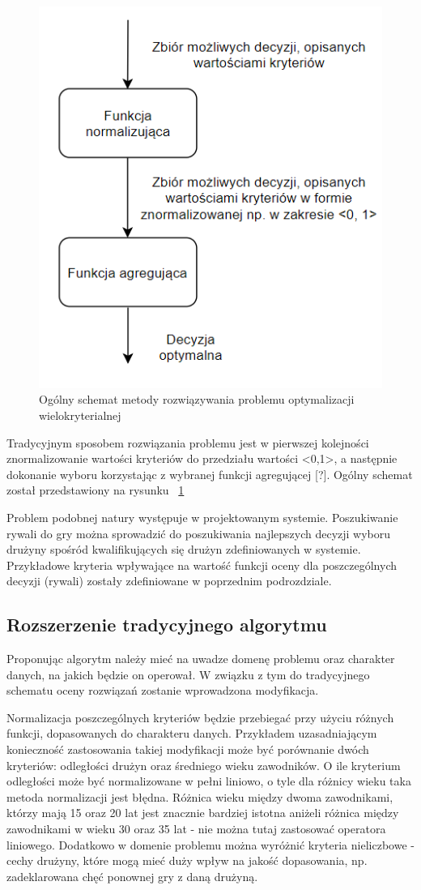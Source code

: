 \begin{figure}[ht]
\centering
\includegraphics[width=0.5\linewidth]{03-koncept/rys/tradycyjne-algorytmy-opt.PNG}
\caption{Ogólny schemat metody rozwiązywania problemu optymalizacji wielokryterialnej}
\label{fig:diagram-trad-alg-opt}
\end{figure}

Tradycyjnym sposobem rozwiązania problemu jest w pierwszej kolejności znormalizowanie wartości kryteriów do przedziału wartości <0,1>, a następnie dokonanie wyboru korzystając z wybranej funkcji agregującej [?]. Ogólny schemat został przedstawiony na rysunku ~\ref{fig:diagram-trad-alg-opt}

Problem podobnej natury występuje w projektowanym systemie. Poszukiwanie rywali do gry można sprowadzić do poszukiwania najlepszych decyzji wyboru drużyny spośród kwalifikujących się drużyn zdefiniowanych w systemie. Przykładowe kryteria wpływające na wartość funkcji oceny dla poszczególnych decyzji (rywali) zostały zdefiniowane w poprzednim podrozdziale.

\subsection{Rozszerzenie tradycyjnego algorytmu}

Proponując algorytm należy mieć na uwadze domenę problemu oraz charakter danych, na jakich będzie on operował. W związku z tym do tradycyjnego schematu oceny rozwiązań zostanie wprowadzona modyfikacja.

 Normalizacja poszczególnych kryteriów będzie przebiegać przy użyciu różnych funkcji, dopasowanych do charakteru danych. Przykładem uzasadniającym konieczność zastosowania takiej modyfikacji może być porównanie dwóch kryteriów: odległości drużyn oraz średniego wieku zawodników. O ile kryterium odległości może być normalizowane w pełni liniowo, o tyle dla różnicy wieku taka metoda normalizacji jest błędna. Różnica wieku między dwoma zawodnikami, którzy mają 15 oraz 20 lat jest znacznie bardziej istotna aniżeli różnica między zawodnikami w wieku 30 oraz 35 lat - nie można tutaj zastosować operatora liniowego. Dodatkowo w domenie problemu można wyróżnić kryteria nieliczbowe - cechy drużyny, które mogą mieć duży wpływ na jakość dopasowania, np. zadeklarowana chęć ponownej gry z daną drużyną.   

